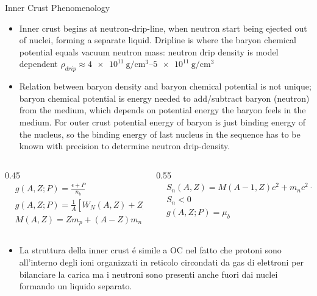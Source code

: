 \begin{frame}{Inner Crust Phenomenology}
    \begin{itemize}
        \item Inner crust begins at neutron-drip-line, when neutron start being ejected out of nuclei, forming a separate liquid. Dripline is where the baryon chemical potential equals vacuum neutron mass: neutron drip density is model dependent $\rho_{drip}\approx\SIrange{4e11}{5e11}{\gram\per\cubic\cm}$
        \item Relation between baryon density and baryon chemical potential is not unique; baryon chemical potential is energy needed to add/subtract baryon (neutron) from the medium, which depends on potential energy the baryon feels in the medium. For outer crust potential energy of baryon is just binding energy of the nucleus, so the binding energy of last nucleus in the sequence has to be known with precision to determine neutron drip-density.
    \end{itemize}
            \begin{columns}[T]
                \begin{column}{0.45\textwidth}
                    \begin{align*}
                        &g(A,Z;P)=\frac{\epsilon+P}{n_b}\tag{$T=0$}\\
                        &g(A,Z;P)=\frac{1}{A}[W_N(A,Z)+Z\mu_e+\frac{4}{3}W_L]\\
                        &M(A,Z)=Zm_p+(A-Z)m_n-B(A,Z)
                    \end{align*}
                \end{column}
                \begin{column}{0.55\textwidth}
                    \begin{align*}
                        &S_n(A,Z)=M(A-1,Z)c^2+m_nc^2-M(A,Z)c^2\tag{vacuum}\\
                        &S_n<0\tag{emissione neutrone}\\
                        &g(A,Z;P)=\mu_b\tag{OC}
                    \end{align*}
                \end{column}
            \end{columns}
            \begin{itemize}
                \item La struttura della inner crust \'e simile a OC nel fatto che protoni sono all'interno degli ioni organizzati in reticolo circondati da gas di elettroni per bilanciare la carica ma i neutroni sono presenti anche fuori dai nuclei formando un liquido separato.

\end{itemize}
\end{frame}
